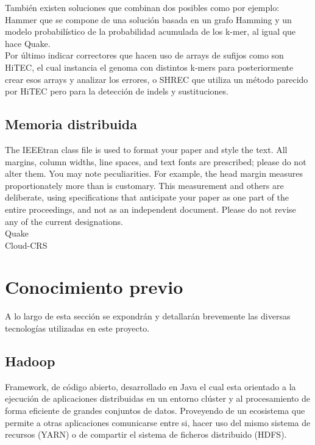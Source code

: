 \documentclass[conference]{IEEEtran}
\begin{document}
También existen soluciones que combinan dos posibles como por ejemplo: Hammer que se compone de una solución basada en un grafo Hamming y un modelo probabilístico de la probabilidad acumulada de los k-mer, al igual que hace Quake.\\

Por último indicar correctores que hacen uso de arrays de sufijos como son HiTEC, el cual instancia el genoma con distintos k-mers para posteriormente crear esos arrays y analizar los errores, o SHREC que utiliza un método parecido por HiTEC pero para la detección de indels y sustituciones.\\

\subsection{Memoria distribuida}

The IEEEtran class file is used to format your paper and style the text. All margins, 
column widths, line spaces, and text fonts are prescribed; please do not 
alter them. You may note peculiarities. For example, the head margin
measures proportionately more than is customary. This measurement 
and others are deliberate, using specifications that anticipate your paper 
as one part of the entire proceedings, and not as an independent document. 
Please do not revise any of the current designations.\\	

Quake\\

Cloud-CRS

\section{Conocimiento previo}

A lo largo de esta sección se expondrán y detallarán brevemente las diversas tecnologías utilizadas en este proyecto.

\subsection{Hadoop}
Framework, de código abierto, desarrollado en Java el cual esta orientado a la ejecución de aplicaciones distribuidas en un entorno clúster y al procesamiento de forma eficiente de grandes conjuntos de datos. Proveyendo de un ecosistema que permite a otras aplicaciones comunicarse entre si, hacer uso del mismo sistema de recursos (YARN) o de compartir el sistema de ficheros distribuido (HDFS).
\end{document}
